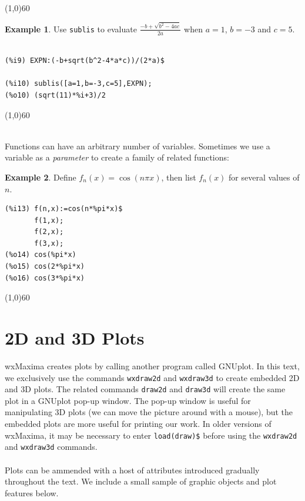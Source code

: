\documentclass[10.5pt,twoside]{report}
\theoremstyle{definition}
\newtheorem{exmp}{Example}[section]
\begin{document}
\line(1,0){60}
\linethickness{0.5mm}

\begin{exmp} Use \verb|sublis| to evaluate $\frac{-b+\sqrt{b^2-4ac}}{2a}$ when $a=1$, $b=-3$ and $c=5$.\\
${}$\\
\begin{verbatim}
(%i9) EXPN:(-b+sqrt(b^2-4*a*c))/(2*a)$

(%i10) sublis([a=1,b=-3,c=5],EXPN);
(%o10) (sqrt(11)*%i+3)/2
\end{verbatim}

\end{exmp}

\line(1,0){60}
\linethickness{0.5mm}

${}$\\

Functions can have an arbitrary number of variables.  Sometimes we use a variable as a \textit{parameter} to create a family of related functions:

\begin{exmp} Define $f_n(x)=\cos{(n\pi x)}$, then list $f_n(x)$ for several values of $n$.\\


\begin{verbatim}
(%i13) f(n,x):=cos(n*%pi*x)$
       f(1,x);
       f(2,x);
       f(3,x);
(%o14) cos(%pi*x)
(%o15) cos(2*%pi*x)
(%o16) cos(3*%pi*x)
\end{verbatim}

\end{exmp}


\line(1,0){60}
\linethickness{0.5mm}



\pagebreak


\section{2D and 3D Plots}\label{2D and 3D Plots}

wxMaxima creates plots by calling another program called GNUplot.  In this text, we exclusively use the commands \verb|wxdraw2d| and \verb|wxdraw3d| to create embedded 2D and 3D plots.  The related commands \verb|draw2d| and \verb|draw3d| will create the same plot in a GNUplot pop-up window.  The pop-up window is useful for manipulating 3D plots (we can move the picture around with a mouse), but the embedded plots are more useful for printing our work.  In older versions of wxMaxima, it may be necessary to enter \verb|load(draw)$| before using the \verb|wxdraw2d| and \verb|wxdraw3d| commands.\\
${}$\\
Plots can be ammended with a host of attributes introduced gradually throughout the text.  We include a small sample of graphic objects and plot features below.
\end{document}
